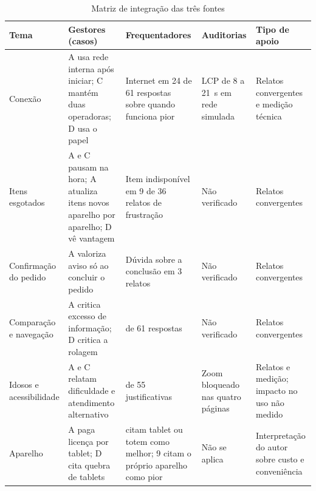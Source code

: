 \begin{table}[!ht]
    \caption{Matriz de integração das três fontes}
    \label{tab:matriz-fontes}
    \centering
    \footnotesize
    \begin{tabular}{@{}>{\raggedright\arraybackslash}p{2.0cm}>{\raggedright\arraybackslash}p{3.5cm}>{\raggedright\arraybackslash}p{3.3cm}>{\raggedright\arraybackslash}p{2.4cm}>{\raggedright\arraybackslash}p{2.8cm}@{}}
        \toprule
        \textbf{Tema} & \textbf{Gestores (casos)} & \textbf{Frequentadores} & \textbf{Auditorias} & \textbf{Tipo de apoio} \\
        \midrule
        Conexão & A usa rede interna após iniciar; C mantém duas operadoras; D usa o papel & Internet em 24 de 61 respostas sobre quando funciona pior & LCP de 8 a 21~s em rede simulada & Relatos convergentes e medição técnica \\
        Itens esgotados & A e C pausam na hora; A atualiza itens novos aparelho por aparelho; D vê vantagem & Item indisponível em 9 de 36 relatos de frustração & Não verificado & Relatos convergentes \\
        Confirmação do pedido & A valoriza aviso só ao concluir o pedido & Dúvida sobre a conclusão em 3 relatos & Não verificado & Relatos convergentes \\
        Comparação e navegação & A critica excesso de informação; D critica a rolagem & 13 de 61 respostas & Não verificado & Relatos convergentes \\
        Idosos e acessibilidade & A e C relatam dificuldade e atendimento alternativo & 9 de 55 justificativas & Zoom bloqueado nas quatro páginas & Relatos e medição; impacto no uso não medido \\
        Aparelho & A paga licença por tablet; D cita quebra de tablets & 8 citam tablet ou totem como melhor; 9 citam o próprio aparelho como pior & Não se aplica & Interpretação do autor sobre custo e conveniência \\
        \bottomrule
    \end{tabular}
\end{table}
